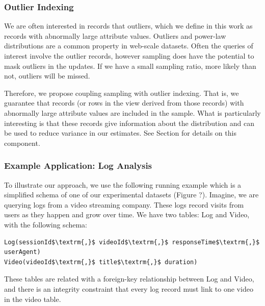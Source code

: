 \subsubsection{Outlier Indexing}
We are often interested in records that outliers, 
which we define in this work as records with abnormally large attribute values.
Outliers and power-law distributions are a common property in web-scale datasets.
Often the queries of interest involve the outlier records, however sampling does 
have the potential to mask outliers in the updates.
If we have a small sampling ratio, more likely than not, outliers will be missed.

Therefore, we propose coupling sampling with outlier indexing. 
That is, we guarantee that records (or rows in the view derived from those records) 
with abnormally large attribute values are included in the sample.
What is particularly interesting is that these records give information about the distribution 
and can be used to reduce variance in our estimates.
See Section \label{outlier} for details on this component.

\subsubsection{Example Application: Log Analysis}
To illustrate our approach, we use the following running example which is a 
simplified schema of one of our experimental datasets (Figure ?).
Imagine, we are querying logs from a video streaming company. 
These logs record visits from users as they happen and grow over time.
We have two tables: Log and Video, with the following schema:

\begin{lstlisting}[mathescape]
Log(sessionId$\textrm{,}$ videoId$\textrm{,}$ responseTime$\textrm{,}$ userAgent)
Video(videoId$\textrm{,}$ title$\textrm{,}$ duration)
\end{lstlisting}
These tables are related with a foreign-key relationship between
Log and Video, and there is an integrity constraint that every log
record must link to one video in the video table.

